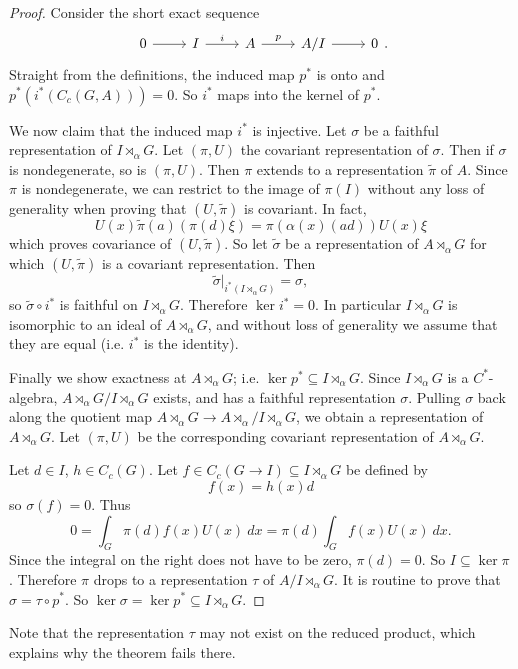 \documentclass[12pt]{report}
\theoremstyle{definition}
\begin{document}
\begin{proof}
    Consider the short exact sequence
$$\begin{tikzcd}0 \arrow[r]& I\arrow[r,"i"] & A\arrow[r,"p"] & A/I\arrow[r] &0\end{tikzcd}.$$
    Straight from the definitions, the induced map $p^*$ is onto and $p^*(i^*(C_c(G, A))) = 0$. So $i^*$ maps into the kernel of $p^*$.

    We now claim that the induced map $i^*$ is injective. Let $\sigma$ be a faithful representation of $I \rtimes_\alpha G$. Let $(\pi, U)$ the covariant representation of $\sigma$. Then if $\sigma$ is nondegenerate, so is $(\pi, U)$. Then $\pi$ extends to a representation $\tilde \pi$ of $A$. Since $\pi$ is nondegenerate, we can restrict to the image of $\pi(I)$ without any loss of generality when proving that $(U, \tilde \pi)$ is covariant. In fact,
    $$U(x)\tilde \pi(a)(\pi(d)\xi) = \pi(\alpha(x)(ad))U(x)\xi$$
    which proves covariance of $(U, \tilde \pi)$. So let $\tilde \sigma$ be a representation of $A \rtimes_\alpha G$ for which $(U, \tilde \pi)$ is a covariant representation. Then
    $$\tilde\sigma|_{i^*(I \rtimes_\alpha G)} = \sigma,$$
    so $\tilde \sigma \circ i^*$ is faithful on $I \rtimes_\alpha G$. Therefore $\ker i^* = 0$. In particular $I \rtimes_\alpha G$ is isomorphic to an ideal of $A \rtimes_\alpha G$, and without loss of generality we assume that they are equal (i.e. $i^*$ is the identity).

    Finally we show exactness at $A \rtimes_\alpha G$; i.e. $\ker p^* \subseteq I \rtimes_\alpha G$. Since $I \rtimes_\alpha G$ is a $C^*$-algebra, $A \rtimes_\alpha G/I \rtimes_\alpha G$ exists, and has a faithful representation $\sigma$. Pulling $\sigma$ back along the quotient map $A \rtimes_\alpha G \to A \rtimes_\alpha/I \rtimes_\alpha G$, we obtain a representation of $A \rtimes_\alpha G$. Let $(\pi, U)$ be the corresponding covariant representation of $A \rtimes_\alpha G$.

    Let $d \in I$, $h \in C_c(G)$. Let $f \in C_c(G \to I) \subseteq I \rtimes_\alpha G$ be defined by
    $$f(x) = h(x)d$$
    so $\sigma(f) = 0$. Thus
    $$0 = \int_G \pi(d)f(x)U(x) ~dx = \pi(d) \int_G f(x)U(x) ~dx.$$
    Since the integral on the right does not have to be zero, $\pi(d) = 0$. So $I \subseteq \ker \pi$. Therefore $\pi$ drops to a representation $\tau$ of $A/I \rtimes_\alpha G$. It is routine to prove that $\sigma = \tau \circ p^*$. So $\ker \sigma = \ker p^* \subseteq I \rtimes_\alpha G$.
\end{proof}
    Note that the representation $\tau$ may not exist on the reduced product, which explains why the theorem fails there.
\end{document}
